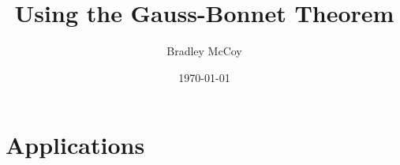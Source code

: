 \documentclass[12pt]{article}
\title{Using the Gauss-Bonnet Theorem}
\author{Bradley McCoy}
\date{\today}
\begin{document}
\maketitle \tableofcontents 
\pagebreak







%

\section{Applications}\label{sec:applications}













{
\small

%

}
\end{document}
